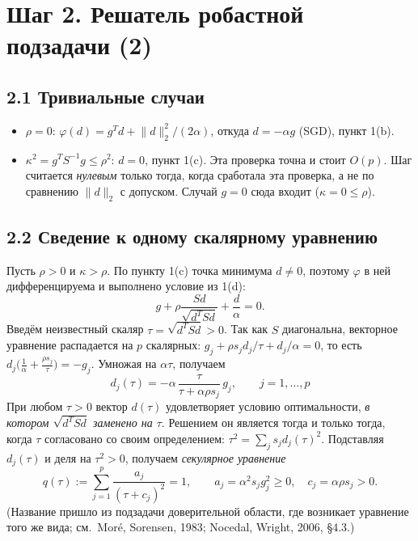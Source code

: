 \documentclass[11pt,a4paper]{article}
\newcommand{\norm}[1]{\lVert #1\rVert_2}
\begin{document}
\section*{Шаг 2. Решатель робастной подзадачи (2)}

\subsection*{2.1 Тривиальные случаи}
\begin{itemize}
\item $\rho=0$: $\varphi(d)=g^Td+\norm d^2/(2\alpha)$, откуда $d=-\alpha g$ (SGD),
пункт 1(b).
\item $\kappa^2=g^TS^{-1}g\le\rho^2$: $d=0$, пункт 1(c). Эта проверка точна и стоит
$O(p)$. Шаг считается \emph{нулевым} только тогда, когда сработала эта проверка, а не
по сравнению $\norm d$ с допуском. Случай $g=0$ сюда входит ($\kappa=0\le\rho$).
\end{itemize}

\subsection*{2.2 Сведение к одному скалярному уравнению}

Пусть $\rho>0$ и $\kappa>\rho$. По пункту 1(c) точка минимума $d\neq0$, поэтому
$\varphi$ в ней дифференцируема и выполнено условие из 1(d):
\begin{equation*}
g+\rho\frac{Sd}{\sqrt{d^TSd}}+\frac d\alpha=0 .
\end{equation*}
Введём неизвестный скаляр $\tau=\sqrt{d^TSd}>0$. Так как $S$ диагональна, векторное
уравнение распадается на $p$ скалярных: $g_j+\rho s_jd_j/\tau+d_j/\alpha=0$, то есть
$d_j\big(\tfrac1\alpha+\tfrac{\rho s_j}{\tau}\big)=-g_j$. Умножая на $\alpha\tau$,
получаем
\begin{equation*}
\boxed{\;d_j(\tau)=-\alpha\,\frac{\tau}{\tau+\alpha\rho s_j}\,g_j,\qquad j=1,\dots,p\;}
\end{equation*}
При любом $\tau>0$ вектор $d(\tau)$ удовлетворяет условию оптимальности, \emph{в
котором $\sqrt{d^TSd}$ заменено на $\tau$}. Решением он является тогда и только тогда,
когда $\tau$ согласовано со своим определением: $\tau^2=\sum_js_jd_j(\tau)^2$.
Подставляя $d_j(\tau)$ и деля на $\tau^2>0$, получаем \emph{секулярное уравнение}
\begin{equation*}
q(\tau):=\sum_{j=1}^p\frac{a_j}{(\tau+c_j)^2}=1,\qquad
a_j=\alpha^2s_jg_j^2\ge0,\quad c_j=\alpha\rho s_j>0 .
\end{equation*}
(Название пришло из подзадачи доверительной области, где возникает уравнение того же
вида; см.\ Moré, Sorensen, 1983; Nocedal, Wright, 2006, §4.3.)
\end{document}
